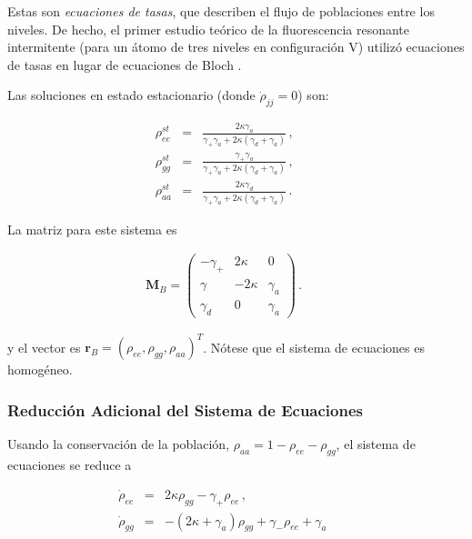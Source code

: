 \documentclass[12pt]{article}
\begin{document}
Estas son \textit{ecuaciones de tasas}, que describen el flujo de poblaciones entre los niveles. De hecho, el primer estudio teórico de la fluorescencia resonante intermitente (para un átomo de tres niveles en configuración V) utilizó ecuaciones de tasas en lugar de ecuaciones de Bloch \cite{CoKi86}.

Las soluciones en estado estacionario (donde $\dot{\rho}_{jj} = 0$) son:

\begin{subequations}
\begin{eqnarray}
\rho_{ee}^{st} &=& \frac{ 2\kappa \gamma_a }
		{ \gamma_+ \gamma_a +2\kappa (\gamma_d +\gamma_a) } \,, \\
\rho_{gg}^{st} &=& \frac{ \gamma_+ \gamma_a }
		{ \gamma_+ \gamma_a +2\kappa (\gamma_d +\gamma_a) } \,, \\ 
\rho_{aa}^{st} &=& \frac{ 2\kappa \gamma_d }
		{ \gamma_+ \gamma_a +2\kappa (\gamma_d +\gamma_a) } \,. 
		\qquad
\end{eqnarray}
\end{subequations}

La matriz para este sistema es

\begin{eqnarray}
\mathbf{M}_{B} = \left( \begin{array}{ccc} 
	-\gamma_+ & 2\kappa & 0 \\ 
	\gamma & -2\kappa &\gamma_a \\
	\gamma_d & 0 & \gamma_a  \end{array}  \right) \,.  \qquad 
\end{eqnarray}

y el vector es $\mathbf{r}_{B} = \left( \rho_{ee}, \rho_{gg}, \rho_{aa} \right)^T$. Nótese que el sistema de ecuaciones es homogéneo.

\subsubsection{Reducción Adicional del Sistema de Ecuaciones}

Usando la conservación de la población, $\rho_{aa} = 1 - \rho_{ee} - \rho_{gg}$, el sistema de ecuaciones se reduce a

\begin{subequations}
\begin{eqnarray}
\dot{\rho}_{ee} &=& 2\kappa \rho_{gg} -\gamma_+ \rho_{ee} 	\,, \\ 
\dot{\rho}_{gg} &=& -(2\kappa +\gamma_a) \rho_{gg} 
	+\gamma_- \rho_{ee} +\gamma_a  	 	\, \qquad
\end{eqnarray}
\end{subequations}
\end{document}
